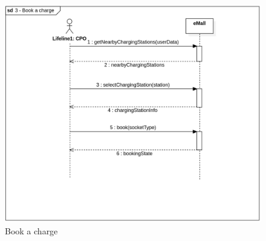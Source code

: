 \begin{figure}[H]
    \begin{center}
        \includegraphics[width=\textwidth]{img/sequence/book.png}
        \caption{Book a charge}
    \end{center}
\end{figure}
\newpage
